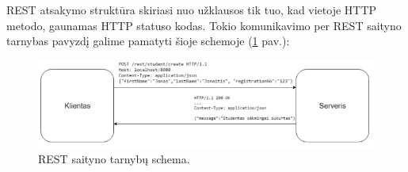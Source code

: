 REST atsakymo struktūra skiriasi nuo užklausos tik tuo, kad vietoje HTTP metodo, gaunamas HTTP statuso kodas. Tokio komunikavimo
per REST saityno tarnybas pavyzdį galime pamatyti šioje schemoje (\ref{img:Restful-scheme} pav.):

\begin{figure}[H]
  \centering
  \includegraphics[scale=0.6]{img/Restful-scheme}
  \caption{REST saityno tarnybų schema.}
  \label{img:Restful-scheme}
\end{figure}

